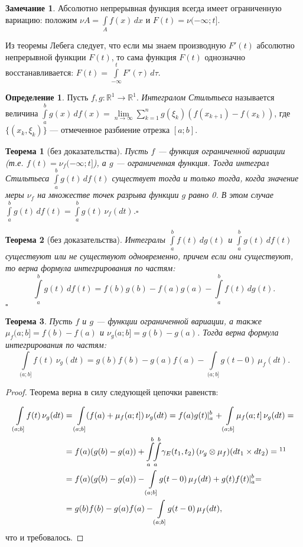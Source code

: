\documentclass[12pt,titlepage]{article}
\newcounter{tema}
\newtheorem{theorem}{Теорема}[tema]
\theoremstyle{definition}
\newtheorem{defen}{Определение}[tema]
\newtheorem*{zam}{Замечание}
\begin{document}
\begin{zam}
Абсолютно непрерывная функция всегда имеет ограниченную вариацию:
положим $\nu A=\int\limits_A\!f(x)\,dx$ и $F(t)=\nu(-\infty;t]$.

Из теоремы Лебега следует, что если мы знаем производную $F'(t)$
абсолютно непрерывной функции $F(t)$, то сама функция $F(t)$
однозначно восстанавливается:
$F(t)=\int\limits_{-\infty}^t\!F'(\tau)\,d\tau$.
\end{zam}

\begin{defen}
Пусть $f,g\colon \mathbb{R}^1\to\mathbb{R}^1$. \emph{Интегралом
Стильтьеса} называется величина
$\int\limits_a^b\!g(x)\,df(x)=\lim\limits_{n\to\infty}\sum\limits_{k=1}^n
g(\xi_k)(f(x_{k+1})-f(x_k))$, где $\{(x_k,\xi_k)\}$ --- отмеченное
разбиение отрезка $[a;b]$.
\end{defen}

\begin{theorem}[без доказательства]
Пусть $f$ --- функция ограниченной вариации \textup{(}т.е.
$f(t)=\nu_f(-\infty;t]$\textup{)}, а $g$ --- ограниченная функция.
Тогда интеграл Стильтьеса $\int\limits_a^b\!g(t)\,df(t)$ существует
тогда и только тогда, когда значение меры $\nu_f$ на множестве точек
разрыва функции $g$ равно 0. В этом случае
$\int\limits_a^b\!g(t)\,df(t)=\int\limits_a^b\!g(t)\,\nu_f(dt)$.\hfill{$\square$}
\end{theorem}

\begin{theorem}[без доказательства]
Интегралы $\int\limits_a^b\!f(t)\,dg(t)$ и
$\int\limits_a^b\!g(t)\,df(t)$ существуют или не существуют
одновременно, причем если они существуют, то верна формула
интегрирования по частям: $$\int\limits_a^b\!g(t)\,df(t)=
f(b)g(b)-f(a)g(a)-\int\limits_a^b\!f(t)\,dg(t).$$\hfill{$\square$}
\end{theorem}

\begin{theorem}
Пусть $f$ и $g$ --- функции ограниченной вариации, а также
$\mu_f(a;b]=f(b)-f(a)$ и $\nu_g(a;b]=g(b)-g(a)$. Тогда верна формула
интегрирования по частям:
$$\int\limits_{(a;b]}\!f(t)\,\nu_g(dt)=g(b)f(b)-g(a)f(a)-\int\limits_
{(a;b]}\!g(t-0)\,\mu_f(dt).$$
\end{theorem}

\begin{proof}
Теорема верна в силу следующей цепочки равенств:

\begin{align*}
\int\limits_{(a;b]}\!f(t)\,\nu_g(dt)&=\int\limits_{(a;b]}\!(f(a)+\mu_f(a;t])\,\nu_g(dt)=
f(a)g(t)\!\!\mid_a^b+\int\limits_{(a;b]}\!\mu_f(a;t]\,\nu_g(dt)=\\
&=f(a)(g(b)-g(a))+\int\limits_a^b\!\!\int\limits_a^b\!\gamma_E(t_1,t_2)\,(\nu_g\otimes\mu_f)(dt_1\times
dt_2)=\footnotemark[11]\\
&=f(a)(g(b)-g(a))-\int\limits_{(a;b]}\!g(t-0)\,\mu_f(dt)+g(t)f(t)\!\!\mid_a^b=\\
&=g(b)f(b)-g(a)f(a)-\int\limits_ {(a;b]}\!g(t-0)\,\mu_f(dt),
\end{align*}%
что и требовалось.
\end{proof}
\end{document}
